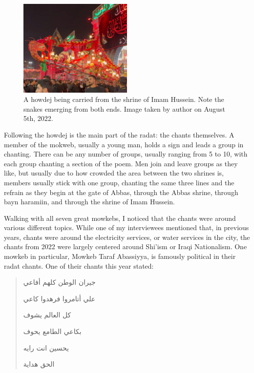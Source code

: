 \begin{figure}
    \centering
    \includegraphics[width=0.5\textwidth]{images/howdej.jpg}
    \caption{A howdej being carried from the shrine of Imam Hussein. Note the snakes emerging from both ends. Image taken by author on August 5th, 2022.}
    \label{fig:howdej}
\end{figure}

Following the howdej is the main part of the radat: the chants themselves. A member of the mokweb, usually a young man, holds a sign and leads a group in chanting. There can be any number of groups, usually ranging from 5 to 10, with each group chanting a section of the poem. Men join and leave groups as they like, but usually due to how crowded the area between the two shrines is, members usually stick with one group, chanting the same three lines and the refrain as they begin at the gate of Abbas, through the Abbas shrine, through bayn haramiin, and through the shrine of Imam Hussein. 

Walking with all seven great mowkebs, I noticed that the chants were around various different topics. While one of my interviewees mentioned that, in previous years, chants were around the electricity services, or water services in the city, the chants from 2022 were largely centered around Shi'ism or Iraqi Nationalism. One mowkeb in particular, Mowkeb Taraf Abassiyya, is famously political in their radat chants. One of their chants this year stated: 

\begin{quote}
\begin{Arabic}
جيران الوطن كلهم أفاعي

علي أتامروا فرهدوا كاعي

كل العالم يشوف

بكاعي الطامع يحوف

يحسين انت رايه

الحق هداية
\end{Arabic}
\end{quote}

